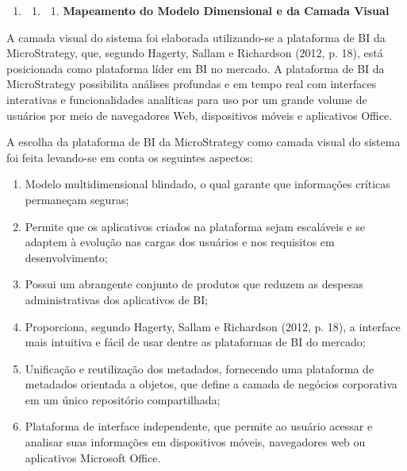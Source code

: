 \documentclass[a4paper]{article}
\newcommand\liststyleWWviiiNumi{%
\renewcommand\theenumi{\arabic{enumi}}
\renewcommand\theenumii{\arabic{enumi}.\arabic{enumii}}
\renewcommand\theenumiii{\arabic{enumi}.\arabic{enumii}.\arabic{enumiii}}
\renewcommand\theenumiv{\arabic{enumi}.\arabic{enumii}.\arabic{enumiii}.\arabic{enumiv}}
\renewcommand\labelenumi{\theenumi}
\renewcommand\labelenumii{\theenumii}
\renewcommand\labelenumiii{\theenumiii}
\renewcommand\labelenumiv{\theenumiv.}
}
\newcommand\liststyleWWviiiNumxxi{%
\renewcommand\theenumi{\alph{enumi}}
\renewcommand\theenumii{\alph{enumii}}
\renewcommand\theenumiii{\roman{enumiii}}
\renewcommand\theenumiv{\arabic{enumiv}}
\renewcommand\labelenumi{\theenumi)}
\renewcommand\labelenumii{\theenumii.}
\renewcommand\labelenumiii{\theenumiii.}
\renewcommand\labelenumiv{\theenumiv.}
}
\begin{document}
\bigskip

\liststyleWWviiiNumi
\begin{enumerate}
\item \begin{enumerate}
\item \begin{enumerate}
\item {
\textsf{\textbf{Mapeamento do Modelo Dimensional e da Camada Visual}}}
\end{enumerate}
\end{enumerate}
\end{enumerate}
{
\textsf{A camada visual do sistema foi elaborada utilizando-se a plataforma de BI da MicroStrategy, que, segundo
Hagerty, Sallam e Richardson (2012, p. 18), est\'a posicionada como plataforma l\'ider em BI no mercado. A plataforma
de BI da MicroStrategy possibilita an\'alises profundas e em tempo real com interfaces interativas e funcionalidades
anal\'iticas para uso por um grande volume de usu\'arios por meio de navegadores Web, dispositivos m\'oveis e
aplicativos Office.}}

{\sffamily
A escolha da plataforma de BI da MicroStrategy como camada visual do sistema foi feita levando-se em conta os seguintes
aspectos:}

\liststyleWWviiiNumxxi
\begin{enumerate}
\item {
\textsf{Modelo multidimensional blindado, o qual garante que informa\c{c}\~oes cr\'iticas permane\c{c}am seguras;}}
\item {
\textsf{Permite que os aplicativos criados na plataforma sejam escal\'aveis e se adaptem \`a evolu\c{c}\~ao nas cargas
dos usu\'arios e nos requisitos em desenvolvimento;}}
\item {
\textsf{Possui um abrangente conjunto de produtos que reduzem as despesas administrativas dos aplicativos de BI;}}
\item {
\textsf{Proporciona, segundo Hagerty, Sallam e Richardson (2012, p. 18), a interface mais intuitiva e f\'acil de usar
dentre as plataformas de BI do mercado;}}
\item {
\textsf{Unifica\c{c}\~ao e reutiliza\c{c}\~ao dos metadados, fornecendo uma plataforma de metadados orientada a objetos,
que define a camada de neg\'ocios corporativa em um \'unico reposit\'orio compartilhada;}}
\item {\sffamily
Plataforma de interface independente, que permite ao usu\'ario acessar e analisar suas informa\c{c}\~oes em dispositivos
m\'oveis, navegadores web ou aplicativos Microsoft Office.}
\end{enumerate}
\end{document}
